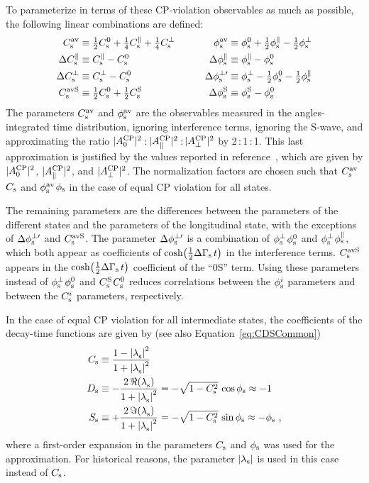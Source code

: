 To parameterize in terms of these CP-violation observables as much as possible, the following linear combinations are defined:
\begin{equation}
  \label{eq:CPVParamDef}
  \begin{alignedat}{2}
    \Csav      &\equiv \tfrac{1}{2}\Cszero + \tfrac{1}{4}\Cspar + \tfrac{1}{4}\Csperp \qquad\quad&
      \phisav       &\equiv \phiszero + \tfrac{1}{2}\phispar - \tfrac{1}{2}\phisperp \\
    \DelCspara &\equiv \Cspar  - \Cszero &
      \Delphispara  &\equiv \phispar - \phiszero \\
    \DelCsperp &\equiv \Csperp - \Cszero &
      \Delphisperpp &\equiv \phisperp - \tfrac{1}{2}\phiszero - \tfrac{1}{2}\phispar \\
    \CsavS     &\equiv \tfrac{1}{2}\Cszero + \tfrac{1}{2}\CsS &
      \DelphisS  &\equiv \phisS - \phiszero \\
  \end{alignedat}
\end{equation}
The parameters $\Csav$ and $\phisav$ are the observables measured in the angles-integrated time distribution, ignoring interference terms,
ignoring the S-wave, and approximating the ratio $\magzeroAvSq$\,:\,$\magparAvSq$\,:\,$\magperpAvSq$ by 2\,:\,1\,:\,1.  This last
approximation is justified by the values reported in reference~\cite{LHCb-PAPER-2013-002,*LHCb-ANA-2012-067}, which are given by
$\magzeroAvSq$, $\magparAvSq$, and $\magperpAvSq$. The normalization factors are chosen such
that $\Csav$\textto$\Cs$ and $\phisav$\textto$\phis$ in the case of equal CP violation for all states.

The remaining parameters are the differences between the parameters of the different states and the parameters of the longitudinal state,
with the exceptions of $\Delphisperpp$ and $\CsavS$. The parameter $\Delphisperpp$ is a combination of $\phisperp$\textminus$\phiszero$ and
$\phisperp$\textminus$\phispar$, which both appear as coefficients of $\cDGs$ in the interference terms. $\CsavS$ appears in the $\cDGs$
coefficient of the ``0S'' term. Using these parameters instead of $\phisperp$\textminus$\phiszero$ and $\CsS$\textminus$\Cszero$ reduces
correlations between the $\phisi$ parameters and between the $\Csi$ parameters, respectively.

In the case of equal CP violation for all intermediate states, the coefficients of the decay-time functions are given by (see also
Equation~\ref{eq:CDSCommon})
\begin{equation}
  \begin{aligned}
    \Cs &\equiv \frac{1-\lamsiSq[]}{1+\lamsiSq[]} \\
    \Ds &\equiv -\frac{2\,\Re(\lamsi[])}{1+\lamsiSq[]} = -\sqrt{1-\Cs^2}\, \cos\phis \approx -1 \\
    \Ss &\equiv +\frac{2\,\Im(\lamsi[])}{1+\lamsiSq[]} = -\sqrt{1-\Cs^2}\, \sin\phis \approx -\phis \ ,
  \end{aligned}
\end{equation}
where a first-order expansion in the parameters $\Cs$ and $\phis$ was used for the approximation. For historical reasons, the parameter
$\lamsAbs$ is used in this case instead of $\Cs$.

